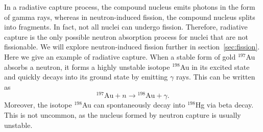 \documentclass[nofootinbib,preprint,aip,pra]{revtex4-1}
\begin{document}
    In a radiative capture process, the compound nucleus emits photons in the form of gamma rays, whereas in neutron-induced
    fission, the compound nucleus splits into fragments.
    In fact, not all nuclei can undergo fission.
    Therefore, radiative capture is the only possible neutron absorption process for
    nuclei that are not fissionable.\cite{lb01} We will explore neutron-induced fission further in
    section~\ref{sec:fission}. Here we give an example of radiative capture. When a stable form
    of gold ${}^{197}$Au absorbs a neutron, it forms a highly unstable isotope ${}^{198}$Au in its
    excited state and quickly decays into its ground state by emitting $\gamma$ rays. This can be
    written as
    \begin{equation}
        {}^{197}\text{Au} + n \rightarrow {}^{198}\text{Au} + \gamma.
    \end{equation}
    Moreover, the isotope ${}^{198}$Au can spontaneously decay into ${}^{198}$Hg via beta decay. This is not
    uncommon, as the nucleus formed by neutron capture is usually unstable.
\end{document}
